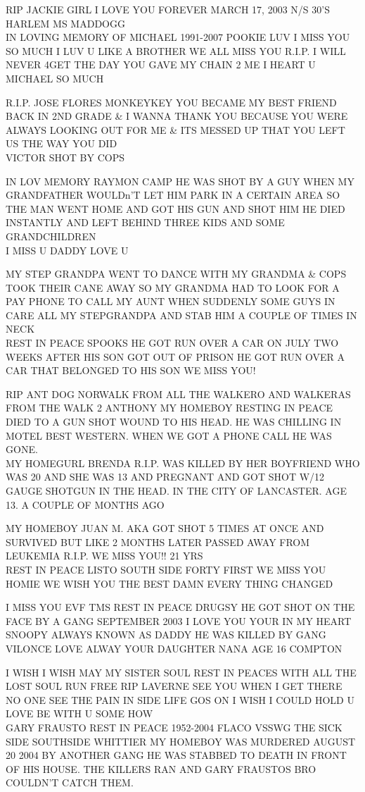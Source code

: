 \documentclass[10pt,letterpaper]{article}
\begin{document}
RIP JACKIE GIRL I LOVE YOU FOREVER MARCH 17, 2003 N/S 30'S HARLEM MS MADDOGG\\
IN LOVING MEMORY OF MICHAEL 1991{-}2007 POOKIE LUV I MISS YOU SO MUCH I LUV U LIKE A BROTHER WE ALL MISS YOU R.I.P. I WILL NEVER 4GET THE DAY YOU GAVE MY CHAIN 2 ME I HEART U MICHAEL SO MUCH

R.I.P. JOSE FLORES MONKEYKEY YOU BECAME MY BEST FRIEND BACK IN 2ND GRADE \& I WANNA THANK YOU BECAUSE YOU WERE ALWAYS LOOKING OUT FOR ME \& ITS MESSED UP THAT YOU LEFT US THE WAY YOU DID\\
VICTOR SHOT BY COPS

IN LOV MEMORY RAYMON CAMP HE WAS SHOT BY A GUY WHEN MY GRANDFATHER WOULDn'T LET HIM PARK IN A CERTAIN AREA SO THE MAN WENT HOME AND GOT HIS GUN AND SHOT HIM HE DIED INSTANTLY AND LEFT BEHIND THREE KIDS AND SOME GRANDCHILDREN\\
I MISS U DADDY LOVE U

MY STEP GRANDPA WENT TO DANCE WITH MY GRANDMA \& COPS TOOK THEIR CANE AWAY SO MY GRANDMA HAD TO LOOK FOR A PAY PHONE TO CALL MY AUNT WHEN SUDDENLY SOME GUYS IN CARE ALL MY STEPGRANDPA AND STAB HIM A COUPLE OF TIMES IN NECK\\
REST IN PEACE SPOOKS HE GOT RUN OVER A CAR ON JULY TWO WEEKS AFTER HIS SON GOT OUT OF PRISON HE GOT RUN OVER A CAR THAT BELONGED TO HIS SON WE MISS YOU!

RIP ANT DOG NORWALK FROM ALL THE WALKERO AND WALKERAS FROM THE WALK  2 ANTHONY MY HOMEBOY RESTING IN PEACE DIED TO A GUN SHOT WOUND TO HIS HEAD.  HE WAS CHILLING IN MOTEL BEST WESTERN.  WHEN WE GOT A PHONE CALL HE WAS GONE.\\
MY HOMEGURL BRENDA R.I.P. WAS KILLED BY HER BOYFRIEND WHO WAS 20 AND SHE WAS 13 AND PREGNANT AND GOT SHOT W/12 GAUGE SHOTGUN IN THE HEAD.  IN THE CITY OF LANCASTER.  AGE 13.  A COUPLE OF MONTHS AGO

MY HOMEBOY JUAN M. AKA GOT SHOT 5 TIMES AT ONCE AND SURVIVED BUT LIKE 2 MONTHS LATER PASSED AWAY FROM LEUKEMIA R.I.P. WE MISS YOU!!  21 YRS\\
REST IN PEACE LISTO SOUTH SIDE FORTY FIRST WE MISS YOU HOMIE WE WISH YOU THE BEST DAMN EVERY THING CHANGED

I MISS YOU EVF TMS REST IN PEACE DRUGSY HE GOT SHOT ON THE FACE BY A GANG SEPTEMBER 2003 I LOVE YOU YOUR IN MY HEART\\
SNOOPY ALWAYS KNOWN AS DADDY HE WAS KILLED BY GANG VILONCE LOVE ALWAY YOUR DAUGHTER NANA AGE 16 COMPTON

I WISH I WISH MAY MY SISTER SOUL REST IN PEACES WITH ALL THE LOST SOUL RUN FREE RIP LAVERNE SEE YOU WHEN I GET THERE NO ONE SEE THE PAIN IN SIDE LIFE GOS ON I WISH I COULD HOLD U LOVE BE WITH U SOME HOW\\
GARY FRAUSTO REST IN PEACE 1952{-}2004 FLACO VSSWG THE SICK SIDE SOUTHSIDE WHITTIER MY HOMEBOY WAS MURDERED AUGUST 20 2004 BY ANOTHER GANG HE WAS STABBED TO DEATH IN FRONT OF HIS HOUSE.  THE KILLERS RAN AND GARY FRAUSTOS BRO COULDN'T CATCH THEM.
\end{document}
